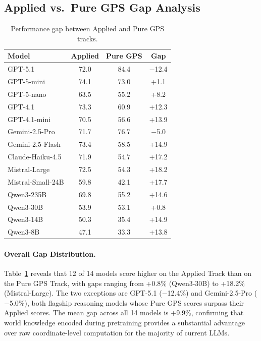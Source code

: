 \subsection{Applied vs.\ Pure GPS Gap Analysis}
\label{app:track_gap}

\begin{table}[htbp]
\centering
\caption{Performance gap between Applied and Pure GPS tracks.}
\label{tab:track_gap}
\small
\begin{tabular}{lccc}
\toprule
\textbf{Model} & \textbf{Applied} & \textbf{Pure GPS} & \textbf{Gap} \\
\midrule
GPT-5.1 & 72.0 & 84.4 & $-$12.4 \\
GPT-5-mini & 74.1 & 73.0 & +1.1 \\
GPT-5-nano & 63.5 & 55.2 & +8.2 \\
GPT-4.1 & 73.3 & 60.9 & +12.3 \\
GPT-4.1-mini & 70.5 & 56.6 & +13.9 \\
\midrule
Gemini-2.5-Pro & 71.7 & 76.7 & $-$5.0 \\
Gemini-2.5-Flash & 73.4 & 58.5 & +14.9 \\
\midrule
Claude-Haiku-4.5 & 71.9 & 54.7 & +17.2 \\
\midrule
Mistral-Large & 72.5 & 54.3 & +18.2 \\
Mistral-Small-24B & 59.8 & 42.1 & +17.7 \\
\midrule
Qwen3-235B & 69.8 & 55.2 & +14.6 \\
Qwen3-30B & 53.9 & 53.1 & +0.8 \\
Qwen3-14B & 50.3 & 35.4 & +14.9 \\
Qwen3-8B & 47.1 & 33.3 & +13.8 \\
\bottomrule
\end{tabular}
\end{table}

\paragraph{Overall Gap Distribution.}
Table~\ref{tab:track_gap} reveals that 12 of 14 models score higher on the Applied Track than on the Pure GPS Track, with gaps ranging from +0.8\% (Qwen3-30B) to +18.2\% (Mistral-Large). The two exceptions are GPT-5.1 ($-$12.4\%) and Gemini-2.5-Pro ($-$5.0\%), both flagship reasoning models whose Pure GPS scores surpass their Applied scores. The mean gap across all 14 models is +9.9\%, confirming that world knowledge encoded during pretraining provides a substantial advantage over raw coordinate-level computation for the majority of current LLMs.


